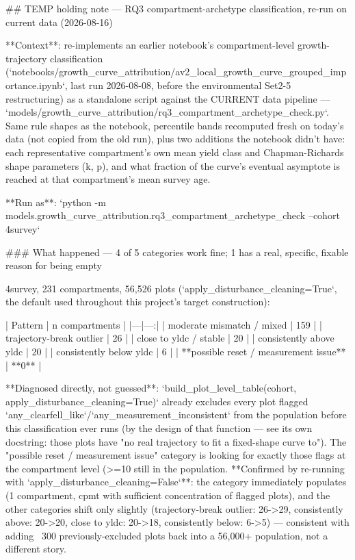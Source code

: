 ## TEMP holding note — RQ3 compartment-archetype classification, re-run on current data (2026-08-16)

**Context**: re-implements an earlier notebook's compartment-level growth-trajectory classification
(`notebooks/growth_curve_attribution/av2_local_growth_curve_grouped_importance.ipynb`, last run
2026-08-08, before the environmental Set2-5 restructuring) as a standalone script against the
CURRENT data pipeline — `models/growth_curve_attribution/rq3_compartment_archetype_check.py`. Same
rule shapes as the notebook, percentile bands recomputed fresh on today's data (not copied from the
old run), plus two additions the notebook didn't have: each representative compartment's own mean
yield class and Chapman-Richards shape parameters (k, p), and what fraction of the curve's eventual
asymptote is reached at that compartment's mean survey age.

**Run as**: `python -m models.growth_curve_attribution.rq3_compartment_archetype_check --cohort 4survey`

### What happened — 4 of 5 categories work fine; 1 has a real, specific, fixable reason for being empty

4survey, 231 compartments, 56,526 plots (`apply_disturbance_cleaning=True`, the default used
throughout this project's target construction):

| Pattern | n compartments |
|---|---:|
| moderate mismatch / mixed | 159 |
| trajectory-break outlier | 26 |
| close to yldc / stable | 20 |
| consistently above yldc | 20 |
| consistently below yldc | 6 |
| **possible reset / measurement issue** | **0** |

**Diagnosed directly, not guessed**: `build_plot_level_table(cohort, apply_disturbance_cleaning=True)`
already excludes every plot flagged `any_clearfell_like`/`any_measurement_inconsistent` from the
population before this classification ever runs (by the design of that function — see its own
docstring: those plots have "no real trajectory to fit a fixed-shape curve to"). The "possible
reset / measurement issue" category is looking for exactly those flags at the compartment level
(>=10%
still in the population. **Confirmed by re-running with `apply_disturbance_cleaning=False`**: the
category immediately populates (1 compartment, cpmt with sufficient concentration of flagged
plots), and the other categories shift only slightly (trajectory-break outlier: 26->29,
consistently above: 20->20, close to yldc: 20->18, consistently below: 6->5) — consistent with
adding ~300 previously-excluded plots back into a 56,000+ population, not a different story.


